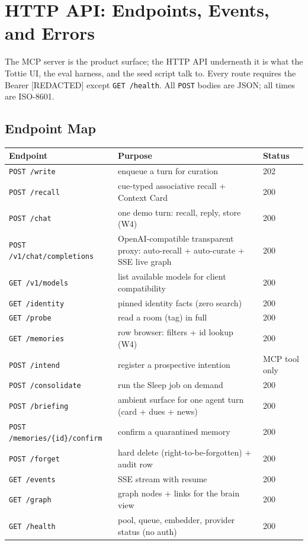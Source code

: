 \chapter{HTTP API: Endpoints, Events, and Errors}

The MCP server is the product surface; the HTTP API underneath it is what the Tottie UI,
the eval harness, and the seed script talk to. Every route requires the Bearer [REDACTED]
except \texttt{GET /health}. All \texttt{POST} bodies are JSON; all times are ISO-8601.

\section{Endpoint Map}
\begin{longtable}{@{}p{}p{}p{}@{}}
\toprule
Endpoint & Purpose & Status \\
\midrule
\texttt{POST /write} & enqueue a turn for curation & 202 \\
\texttt{POST /recall} & cue-typed associative recall + Context Card & 200 \\
\texttt{POST /chat} & one demo turn: recall, reply, store (W4) & 200 \\
\texttt{POST /v1/chat/completions} & OpenAI-compatible transparent proxy: auto-recall + auto-curate + SSE live graph & 200 \\
\texttt{GET /v1/models} & list available models for client compatibility & 200 \\
\texttt{GET /identity} & pinned identity facts (zero search) & 200 \\
\texttt{GET /probe} & read a room (tag) in full & 200 \\
\texttt{GET /memories} & row browser: filters + id lookup (W4) & 200 \\
\texttt{POST /intend} & register a prospective intention & MCP tool only \\
\texttt{POST /consolidate} & run the Sleep job on demand & 200 \\
\texttt{POST /briefing} & ambient surface for one agent turn (card + dues + news) & 200 \\
\texttt{POST /memories/\{id\}/confirm} & confirm a quarantined memory & 200 \\
\texttt{POST /forget} & hard delete (right-to-be-forgotten) + audit row & 200 \\
\texttt{GET /events} & SSE stream with resume & 200 \\
\texttt{GET /graph} & graph nodes + links for the brain view & 200 \\
\texttt{GET /health} & pool, queue, embedder, provider status (no auth) & 200 \\
\bottomrule
\end{longtable}

